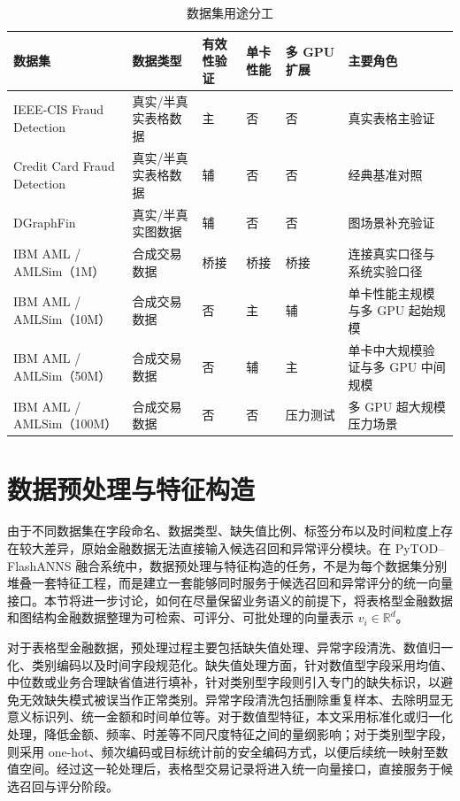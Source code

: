 \begin{table}[htbp]
  \caption{数据集用途分工}
  \label{tab:dataset-roles}
  \centering
  \small
  \renewcommand{\arraystretch}{1.2}
  \begin{adjustbox}{max width=\linewidth}
  \begin{tabular}{P{3.6cm} P{3.2cm} C{1.25cm} C{1.25cm} C{1.45cm} P{3.2cm}}
    \toprule
    数据集 & 数据类型 & 有效性验证 & 单卡性能 & 多 GPU 扩展 & 主要角色\\
    \midrule
    IEEE-CIS Fraud Detection & 真实/半真实表格数据 & 主 & 否 & 否 & 真实表格主验证\\
    Credit Card Fraud Detection & 真实/半真实表格数据 & 辅 & 否 & 否 & 经典基准对照\\
    DGraphFin & 真实/半真实图数据 & 辅 & 否 & 否 & 图场景补充验证\\
    IBM AML / AMLSim（1M） & 合成交易数据 & 桥接 & 桥接 & 桥接 & 连接真实口径与系统实验口径\\
    IBM AML / AMLSim（10M） & 合成交易数据 & 否 & 主 & 辅 & 单卡性能主规模与多 GPU 起始规模\\
    IBM AML / AMLSim（50M） & 合成交易数据 & 否 & 辅 & 主 & 单卡中大规模验证与多 GPU 中间规模\\
    IBM AML / AMLSim（100M） & 合成交易数据 & 否 & 否 & 压力测试 & 多 GPU 超大规模压力场景\\
    \bottomrule
  \end{tabular}
  \end{adjustbox}
\end{table}

\FloatBarrier

\section{数据预处理与特征构造}

由于不同数据集在字段命名、数据类型、缺失值比例、标签分布以及时间粒度上存在较大差异，原始金融数据无法直接输入候选召回和异常评分模块。在 PyTOD--FlashANNS 融合系统中，数据预处理与特征构造的任务，不是为每个数据集分别堆叠一套特征工程，而是建立一套能够同时服务于候选召回和异常评分的统一向量接口。本节将进一步讨论，如何在尽量保留业务语义的前提下，将表格型金融数据和图结构金融数据整理为可检索、可评分、可批处理的向量表示 $v_i\in\mathbb{R}^d$。

对于表格型金融数据，预处理过程主要包括缺失值处理、异常字段清洗、数值归一化、类别编码以及时间字段规范化。缺失值处理方面，针对数值型字段采用均值、中位数或业务合理缺省值进行填补，针对类别型字段则引入专门的缺失标识，以避免无效缺失模式被误当作正常类别。异常字段清洗包括删除重复样本、去除明显无意义标识列、统一金额和时间单位等。对于数值型特征，本文采用标准化或归一化处理，降低金额、频率、时差等不同尺度特征之间的量纲影响；对于类别型字段，则采用 one-hot、频次编码或目标统计前的安全编码方式，以便后续统一映射至数值空间\citep{ieee_cis_fraud,dalpozzolo2015creditcard}。经过这一轮处理后，表格型交易记录将进入统一向量接口，直接服务于候选召回与评分阶段。

